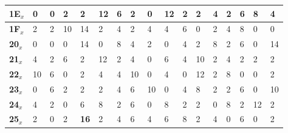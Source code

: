 \begin{longtable}[c]{|l|l|l|l|l|l|l|l|l|l|l|l|l|l|l|l|l|}
\textbf{1E$_x$} & 0              & 0              & 2              & 2              & 12             & 6              & 2              & 0              & 12             & 2              & 2              & 4              & 2              & 6              & 8              & 4              \\ \hline
\textbf{1F$_x$} & 2              & 2              & 10             & 14             & 2              & 4              & 2              & 4              & 4              & 6              & 0              & 2              & 4              & 8              & 0              & 0              \\ \hline
\textbf{20$_x$} & 0              & 0              & 0              & 14             & 0              & 8              & 4              & 2              & 0              & 4              & 2              & 8              & 2              & 6              & 0              & 14             \\ \hline
\textbf{21$_x$} & 4              & 2              & 6              & 2              & 12             & 2              & 4              & 0              & 6              & 4              & 10             & 2              & 4              & 2              & 2              & 2              \\ \hline
\textbf{22$_x$} & 10             & 6              & 0              & 2              & 4              & 4              & 10             & 0              & 4              & 0              & 12             & 2              & 8              & 0              & 0              & 2              \\ \hline
\textbf{23$_x$} & 0              & 6              & 2              & 2              & 2              & 4              & 6              & 10             & 0              & 4              & 8              & 2              & 2              & 6              & 0              & 10             \\ \hline
\textbf{24$_x$} & 4              & 2              & 0              & 6              & 8              & 2              & 6              & 0              & 8              & 2              & 2              & 0              & 8              & 2              & 12             & 2              \\ \hline
\textbf{25$_x$} & 2              & 0              & 2              & \textbf{16}             & 2              & 4              & 6              & 4              & 6              & 8              & 2              & 4              & 0              & 6              & 0              & 2              \\ \hline

\end{longtable}
